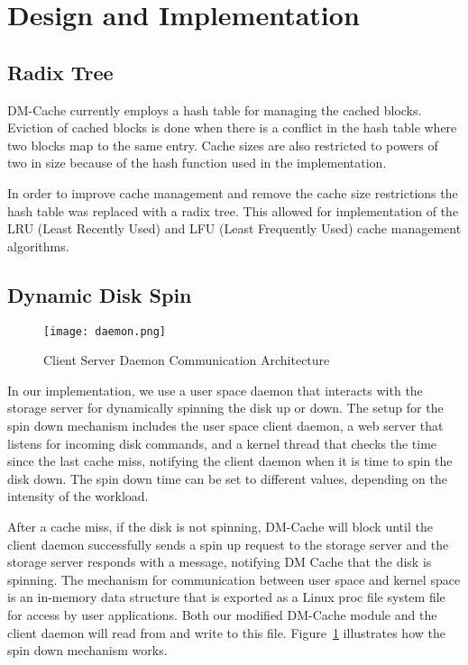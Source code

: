 \section{Design and Implementation}
\label{sec:implementation}

\subsection{Radix Tree}

DM-Cache currently employs a hash table for managing the cached blocks. Eviction
of cached blocks is done when there is a conflict in the hash table where two
blocks map to the same entry. Cache sizes are also restricted to powers of two
in size because of the hash function used in the implementation.

In order to improve cache management and remove the cache size restrictions the
hash table was replaced with a radix tree. This allowed for implementation of
the LRU (Least Recently Used) and LFU (Least Frequently Used) cache management
algorithms.

\subsection{Dynamic Disk Spin}

\begin{figure}[t]
  \centering \texttt{[image: daemon.png]}
  \caption{Client Server Daemon Communication Architecture}
  \label{fig:daemon}
\end{figure}

In our implementation, we use a user space daemon that interacts with the
storage server for dynamically spinning the disk up or down. The setup for the
spin down mechanism includes the user space client daemon, a web server that
listens for incoming disk commands, and a kernel thread that checks the time
since the last cache miss, notifying the client daemon when it is time to spin
the disk down. The spin down time can be set to different values, depending on
the intensity of the workload.

After a cache miss, if the disk is not spinning, DM-Cache will block until the
client daemon successfully sends a spin up request to the storage server and the
storage server responds with a message, notifying DM Cache that the disk is
spinning. The mechanism for communication between user space and kernel space is
an in-memory data structure that is exported as a Linux proc file system file
for access by user applications. Both our modified DM-Cache module and the
client daemon will read from and write to this file. Figure~\ref{fig:daemon}
illustrates how the spin down mechanism works.
